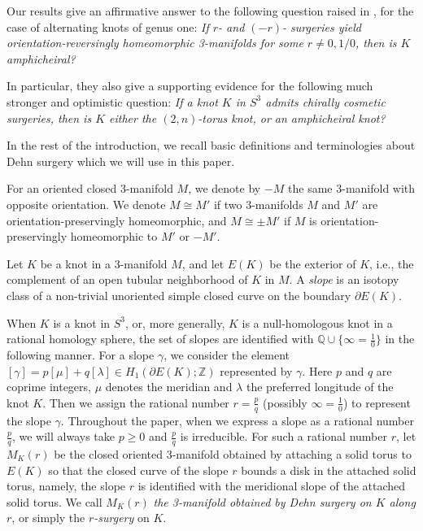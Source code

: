 \documentclass{amsart}
\theoremstyle{remark}
\theoremstyle{definition}
\begin{document}
Our results give an affirmative answer to the following question raised in \cite{ItoTetsuya}, for the case of alternating knots of genus one:
\emph{If $r$- and $(-r)$- surgeries yield orientation-reversingly homeomorphic 3-manifolds for some $r \ne 0, 1/0$, then is $K$ amphicheiral?}

In particular, they also give a supporting evidence for the following much stronger and optimistic question:
\emph{If a knot $K$ in $S^{3}$ admits chirally cosmetic surgeries, then is $K$ either the $(2,n)$-torus knot, or an amphicheiral knot?}

\bigskip

In the rest of the introduction, we recall basic definitions and terminologies about Dehn surgery which we will use in this paper.  

For an oriented closed 3-manifold $M$, we denote by $-M$ the same 3-manifold with opposite orientation. 
We denote $M\cong M'$ if two 3-manifolds $M$ and $M'$ are orientation-preservingly homeomorphic, and $M\cong \pm M'$ if $M$ is orientation-preservingly homeomorphic to $M'$ or $-M'$. 

Let $K$ be a knot in a 3-manifold $M$, and let $E(K)$ be the exterior of $K$, i.e., the complement of an open tubular neighborhood of $K$ in $M$. 
A \emph{slope} is an isotopy class of a non-trivial unoriented simple closed curve on the boundary $\partial E(K)$. 

When $K$ is a knot in $S^{3}$, or, more generally, $K$ is a null-homologous knot in a rational homology sphere, 
the set of slopes are identified with $\mathbb{Q} \cup \{\infty = \frac{1}{0}\}$ in the following manner. 
For a slope $\gamma$, we consider the element $[\gamma] = p[\mu]+q[\lambda] \in H_{1}(\partial E(K);\mathbb{Z})$ represented by $\gamma$. 
Here $p$ and $q$ are coprime integers, $\mu$ denotes the meridian and $\lambda$ the preferred longitude of the knot $K$. 
Then we assign the rational number $r=\frac{p}{q}$ (possibly $\infty=\frac{1}{0}$) to represent the slope $\gamma$.
Throughout the paper, when we express a slope as a rational number $\frac{p}{q}$, we will always take $p\geq 0$ and $\frac{p}{q}$ is irreducible. 
%
For such a rational number $r$, let $M_{K}(r)$ be the closed oriented 3-manifold obtained by attaching a solid torus to $E(K)$ 
so that the closed curve of the slope $r$ bounds a disk in the attached solid torus, namely, the slope $r$ is identified with the meridional slope of the attached solid torus. 
We call $M_{K}(r)$ \emph{the 3-manifold obtained by Dehn surgery on $K$ along $r$}, or simply the \emph{$r$-surgery} on $K$. 
\end{document}
